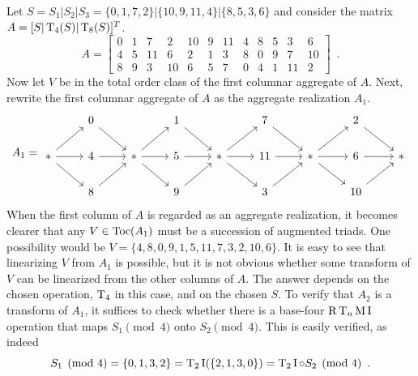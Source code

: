 \begin{example}
    \cite[226, 227]{Starr1984}
    \label{ex:starr-aggregate-realization}
    Let $S = S_1 | S_2 | S_3 = \{ 0, 1, 7, 2 \} | \{ 10, 9, 11, 4 \} | \{ 8, 5, 3, 6 \}$ and consider the matrix $A = [S | \operatorname{T}_4(S) | \operatorname{T}_8(S)]^T$.
    \begin{equation}
        A = \left[
        \begin{array}{cccc|cccc|cccc}
        	0 & 1 & 7 & 2 & 10 & 9 & 11 & 4 & 8 & 5 & 3 & 6 \\
        	4 & 5 & 11 & 6 & 2 & 1 & 3 & 8 & 0 & 9 & 7 & 10 \\
        	8 & 9 & 3 & 10 & 6 & 5 & 7 & 0 & 4 & 1 & 11 & 2
        \end{array}
        \right] \enspace.
    \end{equation}
    Now let $V$ be in the total order class of the first columnar aggregate of $A$. Next, rewrite the first columnar aggregate of $A$ as the aggregate realization $A_1$.
    \begin{equation}
        A_1 = \begin{tikzcd}
            & 0 \arrow[dr] && 1 \arrow[dr] && 7 \arrow[dr] && 2 \arrow[dr] & \\
            * \arrow[r] \arrow[dr] \arrow[ur] & 4 \arrow[r] & * \arrow[r] \arrow[dr] \arrow[ur] & 5 \arrow[r] & * \arrow[r] \arrow[dr] \arrow[ur] & 11 \arrow[r] & * \arrow[r] \arrow[dr] \arrow[ur] & 6 \arrow[r] & * \\
            & 8 \arrow[ur] && 9 \arrow[ur] && 3 \arrow[ur] && 10 \arrow[ur] &
        \end{tikzcd}
    \end{equation}
    When the first column of $A$ is regarded as an aggregate realization, it becomes clearer that any $V \in \operatorname{Toc}(A_1)$ must be a succession of augmented triads. One possibility would be $V = \{ 4, 8, 0, 9, 1, 5, 11, 7, 3, 2, 10, 6 \}$. It is easy to see that linearizing $V$ from $A_1$ is possible, but it is not obvious whether some transform of $V$ can be linearized from the other columns of $A$. The answer depends on the chosen operation, $\operatorname{T}_4$ in this case, and on the chosen $S$. To verify that $A_2$ is a transform of $A_1$, it suffices to check whether there is a base-four $\operatorname{R}\operatorname{T}_n\operatorname{M}\operatorname{I}$ operation that maps $S_1 \pmod 4$ onto $S_2 \pmod 4$. This is easily verified, as indeed
    \begin{equation}
        S_1 \pmod 4 = \{ 0, 1, 3, 2 \} = \T_2\I(\{ 2, 1, 3, 0 \}) = \T_2\I \circ S_2 \pmod 4 \enspace.

\end{equation}
\end{example}
